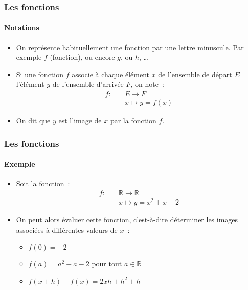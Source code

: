 \documentclass[10pt,notheorems]{beamer}
\theoremstyle{plain}
\theoremstyle{definition} %
\begin{document}
\begin{frame}
  \frametitle{Les fonctions}
  \framesubtitle{Notations}
  \hypertarget{slide_fonctions_notations}{}

  \begin{itemize}
  \item On représente habituellement une fonction par une lettre minuscule. Par exemple $f$ (fonction), ou encore $g$, ou $h$, \ldots\newline
  \item Si une fonction $f$ associe à chaque élément $x$ de l'ensemble de départ $E$ l'élément $y$ de l'ensemble d'arrivée $F$, on note~:
    \[
      \begin{split}
        f: \quad &E \longrightarrow F\\
        &x \longmapsto y = f(x)
      \end{split}
    \]

  \item On dit que $y$ est l'image de $x$ par la fonction $f$.
  \end{itemize}

\end{frame}


\begin{frame}
  \frametitle{Les fonctions}
  \framesubtitle{Exemple}
  \hypertarget{slide_fonctions_exemple}{}

  \begin{itemize}
  \item Soit la fonction~:
    \[
      \begin{split}
        f: \quad &\mathbb R \longrightarrow \mathbb R\\
        &x \longmapsto y = x^2+x-2
      \end{split}
    \]

  \item On peut alors évaluer cette fonction, c'est-à-dire déterminer les images associées à différentes valeurs de $x$~:

    \medskip

    \begin{itemize}
    \item $f(0) = -2$\newline
    \item $f(a) = a^2+a-2$ pour tout $a\in\mathbb R$\newline
    \item $f(x+h)-f(x) = 2xh+h^2+h$
    \end{itemize}
  \end{itemize}

\end{frame}
\end{document}
